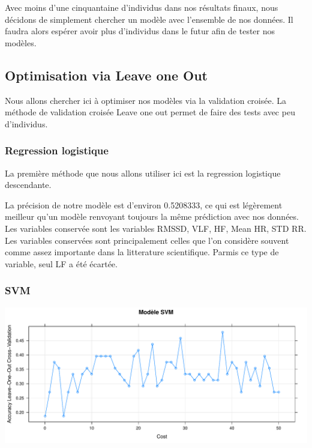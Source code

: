 \documentclass[]{article}
\begin{document}
Avec moins d'une cinquantaine d'individus dans nos résultats finaux,
nous décidons de simplement chercher un modèle avec l'ensemble de nos
données. Il faudra alors espérer avoir plus d'individus dans le futur
afin de tester nos modèles.

\hypertarget{optimisation-via-leave-one-out}{%
\subsection{Optimisation via Leave one
Out}\label{optimisation-via-leave-one-out}}

Nous allons chercher ici à optimiser nos modèles via la validation
croisée. La méthode de validation croisée Leave one out permet de faire
des tests avec peu d'individus.

\hypertarget{regression-logistique-1}{%
\subsubsection{Regression logistique}\label{regression-logistique-1}}

La première méthode que nous allons utiliser ici est la regression
logistique descendante.

La précision de notre modèle est d'environ 0.5208333, ce qui est
légèrement meilleur qu'un modèle renvoyant toujours la même prédiction
avec nos données. Les variables conservée sont les variables RMSSD, VLF,
HF, Mean HR, STD RR. Les variables conservées sont principalement celles
que l'on considère souvent comme assez importante dans la litterature
scientifique. Parmis ce type de variable, seul LF a été écartée.

\hypertarget{svm-1}{%
\subsubsection{SVM}\label{svm-1}}

\includegraphics{repport_projet_files/figure-latex/unnamed-chunk-49-1.pdf}
\end{document}
